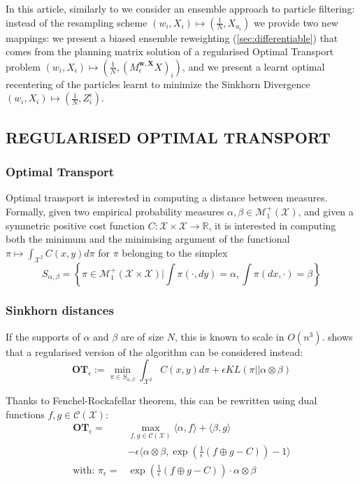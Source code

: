 \documentclass[]{article}
\begin{document}
	In this article, similarly to \parencite{reich2012nonparametric,graham2019scalable} we consider an ensemble approach to particle filtering: instead of the resampling scheme $(w_i, X_i) \mapsto (\frac 1 N, X_{a_i})$ we provide two new mappings: we present a biased ensemble reweighting (\cref{sec:differentiable}) that comes from the planning matrix solution of a regularised Optimal Transport problem $(w_i, X_i) \mapsto (\frac 1 N, (M_{\epsilon}^{\mathbf{w}, \mathbf{X}} X)_i)$, and we present a learnt optimal recentering of the particles learnt to minimize the Sinkhorn Divergence \parencite[see][]{genevay2017learning,feydy:interpolating} $(w_i, X_i) \mapsto (\frac 1 N, Z^{\epsilon}_i)$.

	\subsection{REGULARISED OPTIMAL TRANSPORT}
	\label{subsec:OT}
		\subsubsection{Optimal Transport}
			Optimal transport is interested in computing a distance between measures. Formally, given two empirical probability measures $\alpha, \beta \in \mathcal{M}^+_1(\mathcal{X})$, and given a symmetric positive cost function $C: \mathcal{X} \times \mathcal{X} \to \mathbb{R}$, it is interested in computing both the minimum and the minimising argument of the functional $\pi \mapsto \int_{\mathcal{X}^2} C(x,y) d \pi$ for $\pi$ belonging to the simplex 
			$$S_{\alpha, \beta} = \left\{ \pi \in \mathcal{M}^+_1(\mathcal{X} \times \mathcal{X} ) | \int \pi(\cdot, dy) = \alpha, \int \pi(dx, \cdot) = \beta \right\}$$
			
		\subsubsection{Sinkhorn distances}
		
			If the supports of $\alpha$ and $\beta$ are of size $N$, this is known to scale in $O(n^3)$. \cite{cuturi2013sinkhorn} shows that a regularised version of the algorithm can be considered instead:
			$$\textbf{OT}_{\epsilon} := \min_{\pi \in S_{\alpha, \beta}} \int_{\mathcal{X}^2} C(x,y) d \pi + \epsilon KL(\pi||\alpha \otimes \beta)$$
			
			Thanks to Fenchel-Rockafellar theorem, this can be rewritten \parencite[see][]{feydy:interpolating,peyr2018computational} using dual functions $f, g \in \mathcal{C}(\mathcal{X})$:
			\begin{align}
				\textbf{OT}_{\epsilon} 	=&\max_{f, g \in \mathcal{C}(\mathcal{X})} \langle \alpha, f \rangle + \langle \beta, g \rangle \\
										&- \epsilon \langle \alpha \otimes \beta, \exp \left( \frac 1 \epsilon \left( f \oplus g - C \right)  \right) - 1 \rangle \nonumber\\
				\text{with: } \pi_{\epsilon} 			= &\exp \left( \frac 1 \epsilon \left( f \oplus g - C \right)  \right) \cdot \alpha \otimes \beta \label{eq:plan}
			\end{align}
			
\end{document}
